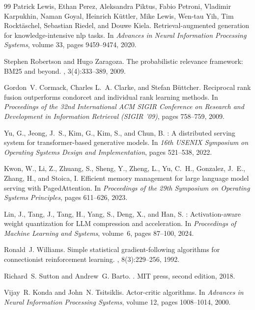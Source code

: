 \documentclass{book}
\begin{document}
\begin{thebibliography}{99}
Patrick Lewis, Ethan Perez, Aleksandra Piktus, Fabio Petroni, Vladimir Karpukhin, Naman Goyal, Heinrich K{\"u}ttler, Mike Lewis, Wen-tau Yih, Tim Rockt{\"a}schel, Sebastian Riedel, and Douwe Kiela.
\newblock Retrieval-augmented generation for knowledge-intensive nlp tasks.
\newblock In {\em Advances in Neural Information Processing Systems}, volume 33, pages 9459--9474, 2020.

Stephen Robertson and Hugo Zaragoza.
\newblock The probabilistic relevance framework: BM25 and beyond.
, 3(4):333--389, 2009.

Gordon~V. Cormack, Charles L.~A. Clarke, and Stefan B{\"u}ttcher.
\newblock Reciprocal rank fusion outperforms condorcet and individual rank learning methods.
\newblock In {\em Proceedings of the 32nd International ACM SIGIR Conference on Research and Development in Information Retrieval (SIGIR '09)}, pages 758--759, 2009.

Yu, G., Jeong, J.~S., Kim, G., Kim, S., and Chun, B.
: A distributed serving system for transformer-based
  generative models.
\newblock In \emph{16th USENIX Symposium on Operating Systems Design
  and Implementation}, pages 521--538, 2022.

Kwon, W., Li, Z., Zhuang, S., Sheng, Y., Zheng, L., Yu, C.~H.,
  Gonzalez, J.~E., Zhang, H., and Stoica, I.
\newblock Efficient memory management for large language model serving
  with {PagedAttention}.
\newblock In \emph{Proceedings of the 29th Symposium on Operating Systems
  Principles}, pages 611--626, 2023.

Lin, J., Tang, J., Tang, H., Yang, S., Deng, X., and Han, S.
: Activation-aware weight quantization for {LLM}
  compression and acceleration.
\newblock In \emph{Proceedings of Machine Learning and Systems},
  volume~6, pages 87--100, 2024.

Ronald~J. Williams.
\newblock Simple statistical gradient-following algorithms for connectionist reinforcement learning.
, 8(3):229--256, 1992.

Richard~S. Sutton and Andrew~G. Barto.
.
\newblock MIT press, second edition, 2018.

Vijay~R. Konda and John~N. Tsitsiklis.
\newblock Actor-critic algorithms.
\newblock In {\em Advances in Neural Information Processing Systems}, volume 12, pages 1008--1014, 2000.


\end{thebibliography}
\end{document}
